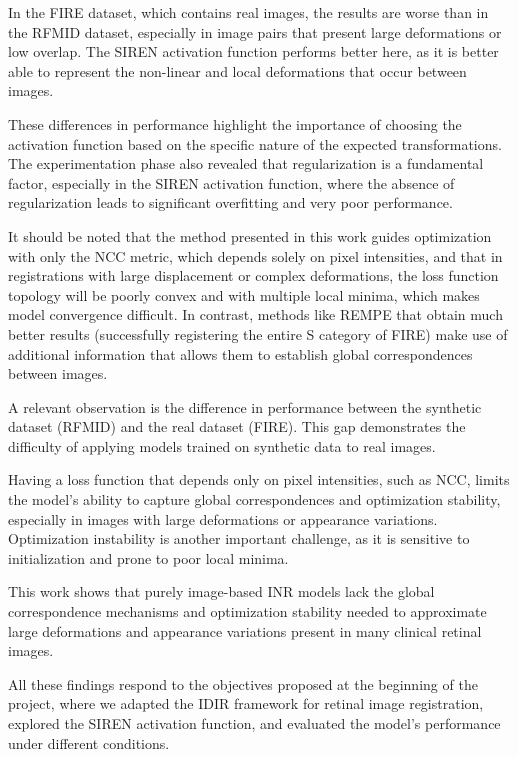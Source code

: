 In the FIRE dataset, which contains real images, the results are worse than in the RFMID dataset, especially in image pairs that present large deformations or low overlap.
The SIREN activation function performs better here, as it is better able to represent the non-linear and local deformations that occur between images.

These differences in performance highlight the importance of choosing the activation function based on the specific nature of the expected transformations.
The experimentation phase also revealed that regularization is a fundamental factor, especially in the SIREN activation function, where the absence of regularization leads to significant overfitting and very poor performance.

It should be noted that the method presented in this work guides optimization with only the NCC metric, which depends solely on pixel intensities, and that in registrations with large displacement or complex deformations, the loss function topology will be poorly convex and with multiple local minima, which makes model convergence difficult.
In contrast, methods like REMPE \cite{rempe} that obtain much better results (successfully registering the entire S category of FIRE) make use of additional information that allows them to establish global correspondences between images.

A relevant observation is the difference in performance between the synthetic dataset (RFMID) and the real dataset (FIRE). This gap demonstrates the difficulty of applying models trained on synthetic data to real images.

Having a loss function that depends only on pixel intensities, such as NCC, limits the model's ability to capture global correspondences and optimization stability, especially in images with large deformations or appearance variations.
Optimization instability is another important challenge, as it is sensitive to initialization and prone to poor local minima.

This work shows that purely image-based \gls{INR} models lack the global correspondence mechanisms and optimization stability needed to approximate large deformations and appearance variations present in many clinical retinal images.

All these findings respond to the objectives proposed at the beginning of the project, where we adapted the IDIR framework for retinal image registration, explored the SIREN activation function, and evaluated the model's performance under different conditions.